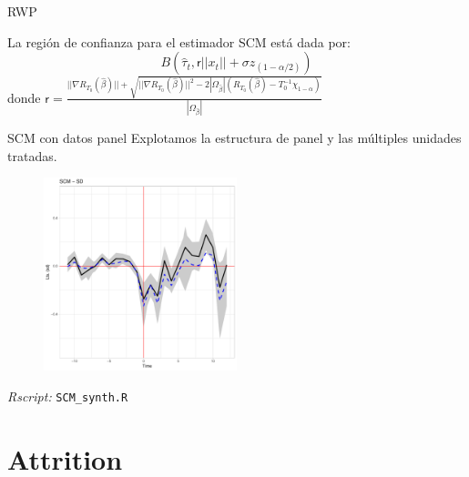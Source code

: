 \documentclass[8pt]{beamer}
\begin{document}
\begin{frame}{RWP}
    \begin{theorem}
    La región de confianza para el estimador SCM está dada por:
     \[B\left(\hat\tau_t,\mathsf{r}||x_t||+\sigma z_{(1-\alpha/2)}\right)\]
donde $\mathsf{r}=\frac{||\nabla R_{T_0}(\hat\beta)||+\sqrt{||\nabla R_{T_0}(\hat\beta)||^2-2|\Omega_{\hat\beta} |\left(R_{T_0}(\hat\beta)-T_0^{-1}\chi_{1-\alpha}\right)}}{|\Omega_{\hat\beta} |}$
    \end{theorem}
\end{frame}
\begin{frame}{SCM con datos panel}
Explotamos la estructura de panel y las múltiples unidades tratadas.
\pause
\begin{figure}[H]
    \begin{center}
        \includegraphics[width=0.5\textwidth]{Figuras/SD_scm_smooth_99.pdf}
        \end{center}
\end{figure}
 \textit{Rscript: } \texttt{SCM\_synth.R}
    

    
\end{frame}

\section{Attrition}
\end{document}
